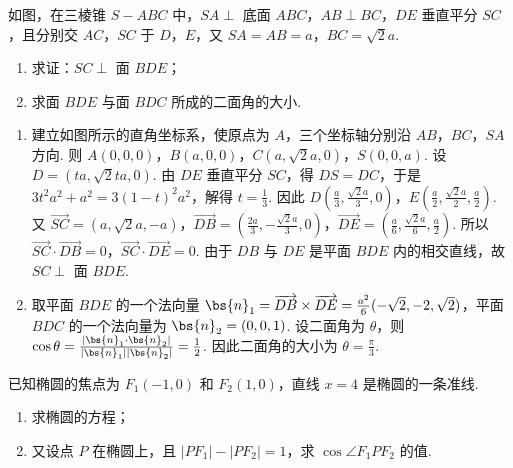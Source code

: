 \begin{problem}
如图，在三棱锥 \(S-ABC\) 中，\(SA\perp\) 底面 \(ABC\)，\(AB\perp BC\)，\(DE\) 垂直平分 \(SC\)，且分别交 \(AC\)，\(SC\) 于 \(D\)，\(E\)，又 \(SA=AB=a\)，\(BC=\sqrt{2}a\).

\begin{enumerate}
\item 求证：\(SC\perp\) 面 \(BDE\)；
\item 求面 \(BDE\) 与面 \(BDC\) 所成的二面角的大小.
\end{enumerate}

\end{problem}

\begin{solution}
\begin{enumerate}
\item 建立如图所示的直角坐标系，使原点为 \(A\)，三个坐标轴分别沿 \(AB\)，\(BC\)，\(SA\) 方向. 则 \(A(0,0,0)\)，\(B(a,0,0)\)，\(C(a,\sqrt{2}a,0)\)，\(S(0,0,a)\). 设 \(D=(ta,\sqrt{2}ta,0)\). 由 \(DE\) 垂直平分 \(SC\)，得 \(DS=DC\)，于是 \(3t^2a^2+a^2=3(1-t)^2a^2\)，解得 \(t=\frac13\). 因此 \(D\left(\frac a3,\frac{\sqrt{2}a}{3},0\right)\)，\(E\left(\frac a2,\frac{\sqrt{2}a}{2},\frac a2\right)\). 又 \(\overrightarrow{SC}=(a,\sqrt{2}a,-a)\)，\(\overrightarrow{DB}=\left(\frac{2a}{3},-\frac{\sqrt{2}a}{3},0\right)\)，\(\overrightarrow{DE}=\left(\frac a6,\frac{\sqrt{2}a}{6},\frac a2\right)\). 所以 \(\overrightarrow{SC}\cdot\overrightarrow{DB}=0\)，\(\overrightarrow{SC}\cdot\overrightarrow{DE}=0\).
由于 \(DB\) 与 \(DE\) 是平面 \(BDE\) 内的相交直线，故 \(SC\perp\) 面 \(BDE\).

\item 取平面 \(BDE\) 的一个法向量 \(\bs{n}_1=\overrightarrow{DB}\times\overrightarrow{DE}=\frac{a^2}{6}(-\sqrt{2},-2,\sqrt{2})\)，平面 \(BDC\) 的一个法向量为 \(\bs{n}_2=(0,0,1)\). 设二面角为 \(\theta\)，则 \(\cos\theta=\frac{|\bs{n}_1\cdot\bs{n}_2|}{|\bs{n}_1||\bs{n}_2|}=\frac12\).
因此二面角的大小为 \(\theta=\frac{\pi}{3}\).
\end{enumerate}
\end{solution}

\begin{problem}
已知椭圆的焦点为 \(F_1(-1,0)\) 和 \(F_2(1,0)\)，直线 \(x=4\) 是椭圆的一条准线.

\begin{enumerate}
\item 求椭圆的方程；
\item 又设点 \(P\) 在椭圆上，且 \(\left| PF_1 \right|-\left| PF_2 \right|=1\)，求 \(\cos\angle F_1PF_2\) 的值.
\end{enumerate}
\end{problem}


